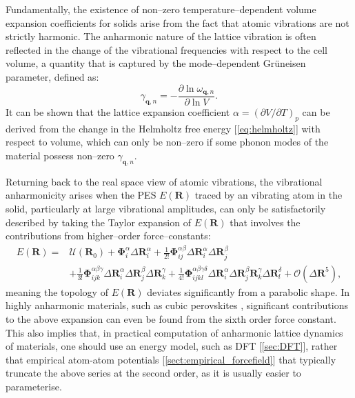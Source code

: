 Fundamentally, the existence of non--zero temperature--dependent volume expansion coefficients for solids arise from the fact that atomic vibrations are not strictly harmonic. The anharmonic nature of the lattice vibration is often reflected in the change of the vibrational frequencies with respect to the cell volume, a quantity that is captured by the mode--dependent Gr\"{u}neisen parameter,\cite{dolling1966thermodynamic} defined as:
\begin{equation}\label{eq:gruneisen}
    \gamma_{\bm{q},n}=-\frac{\partial \ln \omega_{\bm{q},n}}{\partial \ln V}.
\end{equation}
It can be shown that the lattice expansion coefficient $\alpha=(\partial V/\partial T)_p$ can be derived from the change in the Helmholtz free energy [\cref{eq:helmholtz}] with respect to volume, which can only be non--zero if some phonon modes of the material possess  non--zero $\gamma_{\bm{q},n}$. 

Returning back to the real space view of atomic vibrations, the vibrational anharmonicity arises when the PES $E(\bm{R})$ traced by an vibrating atom in the solid, particularly at large vibrational amplitudes, can only be satisfactorily described by taking the  Taylor expansion of $E(\bm{R})$ that involves the contributions from higher--order force--constants:
\begin{align}\label{eq:higher_order_vib_Hamiltonian}
E(\bm{R})=&\mathcal{U}(\bm{R}_{0})+\bm{\Phi}_{i}^{\alpha}\Delta\bm{R}_{i}^{\alpha}+\frac{1}{2!}\bm{\Phi}_{ij}^{\alpha\beta}\Delta\bm{R}_{i}^{\alpha}\Delta\bm{R}_{j}^{\beta}\nonumber \\&+\frac{1}{3!}\bm{\Phi}_{ijk}^{\alpha\beta\gamma}\Delta\bm{R}_{i}^{\alpha}\Delta\bm{R}_{j}^{\beta}\Delta\bm{R}_{k}^{\gamma}+\frac{1}{4!}\bm{\Phi}_{ijkl}^{\alpha\beta\gamma\delta}\Delta\bm{R}_{i}^{\alpha}\Delta\bm{R}_{j}^{\beta}\bm{R}_{k}^{\gamma}\Delta\bm{R}_{l}^{\delta}+\mathcal{O}(\Delta\bm{R}^{5}),
\end{align}
meaning the topology of $E(\bm{R})$ deviates significantly from a parabolic shape. In highly anharmonic materials, such as cubic perovskites , significant contributions to the above expansion can even be found from the sixth order force constant.\cite{tadano2015self} This also implies that, in practical computation of anharmonic lattice dynamics of materials, one should use an energy model, such as DFT [\cref{sec:DFT}], rather that empirical atom-atom potentials [\cref{sect:empirical_forcefield}] that typically truncate the above series at the second order, as it is usually easier to parameterise.

